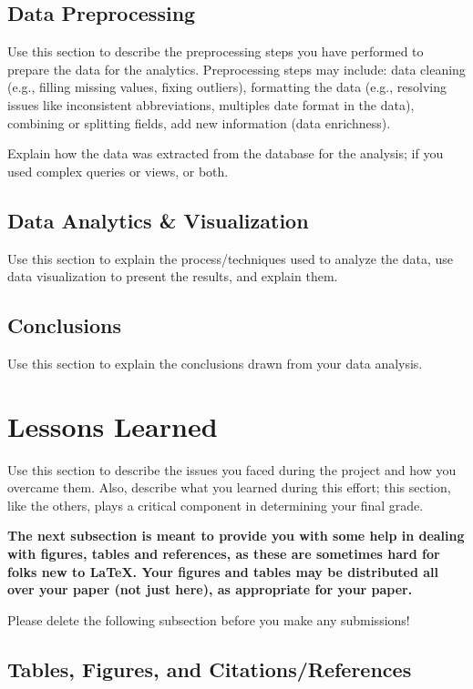 \documentclass[12pt]{article}
\begin{document}
    \subsection{Data Preprocessing}
    Use this section to describe the preprocessing steps you have performed to prepare the data for the analytics. Preprocessing steps may include: data cleaning (e.g., filling missing values, fixing outliers), formatting the data (e.g., resolving issues like inconsistent abbreviations, multiples date format in the data), combining or splitting fields, add new information (data enrichness).

    Explain how the data was extracted from the database for the analysis; if you used complex queries or views, or both.
    \subsection{Data Analytics \& Visualization}
    Use this section to explain the process/techniques used to analyze the data, use data visualization to present the results, and explain them.
    \subsection{Conclusions}
    Use this section to explain the conclusions drawn from your data analysis.\\
    \section{Lessons Learned}
    Use this section to describe the issues you faced during the project and how you overcame them. Also, describe what you learned during this effort; this section, like the others, plays a critical component in determining your final grade.\\

    {\bf The next subsection is meant to provide you with some help in
    dealing with figures, tables and references, as these are sometimes
    hard for folks new to \LaTeX. Your figures and tables
    may be distributed all over your paper (not just here), as appropriate for your paper.

    Please delete the following subsection before you make any submissions!}

    \subsection{Tables, Figures, and Citations/References}
\end{document}

